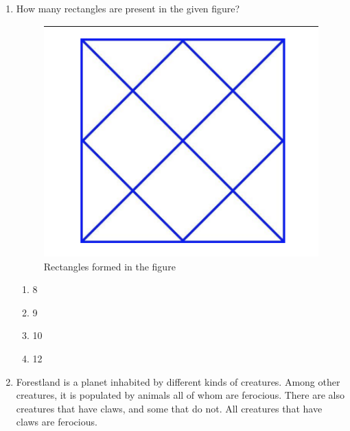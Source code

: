 \documentclass[journal,12pt,onecolumn]{IEEEtran}
\theoremstyle{remark}
\begin{document}
\begin{enumerate}
\begin{minipage}{\linewidth}
(i) there are 30 students who neither like romantic movies nor comedy movies, \\
(ii) the number of students who like romantic movies is twice the number of students who like comedy movies, and \\
(iii) the number of students who like both romantic movies and comedy movies is 20.
\end{minipage}

How many students in the class like romantic movies? 

\begin{multicols}{2}
\begin{enumerate}
\item 40
\item 20
\item 60
\item 30
\end{enumerate}
\end{multicols}


\item How many rectangles are present in the given figure? \hfill{}
\begin{figure}
    \centering
    \includegraphics[width=0.3\linewidth]{figs/image1.png}
    \caption{Rectangles formed in the figure}
    \label{fig:q5_rectangles}
\end{figure}

\begin{multicols}{2}
\begin{enumerate}
\item 8
\item 9
\item 10
\item 12
\end{enumerate}
\end{multicols}



\item Forestland is a planet inhabited by different kinds of creatures. Among other creatures, it is populated by animals all of whom are ferocious. There are also creatures that have claws, and some that do not. All creatures that have claws are ferocious.


\end{enumerate}
\end{document}
